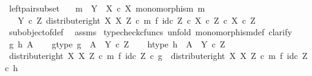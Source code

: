 \begin{isabellebody}
\isamarkupfalse%
%
\endisatagproof
{\isafoldproof}%
%
\isadelimproof
%
\endisadelimproof
%
\isadelimdocument
%
\endisadelimdocument
%
\isatagdocument
%
\isamarkuptrue%
%
\endisatagdocument
{\isafolddocument}%
%
\isadelimdocument
%
\endisadelimdocument
{}\isamarkupfalse%
\ left{\isacharunderscore}{\kern0pt}pair{\isacharunderscore}{\kern0pt}subset{\isacharcolon}{\kern0pt}\isanewline
\ \ \ {\isachardoublequoteopen}m\ {\isacharcolon}{\kern0pt}\ Y\ {\isasymrightarrow}\ X\ {\isasymtimes}\isactrlsub c\ X{\isachardoublequoteclose}\ {\isachardoublequoteopen}monomorphism\ m{\isachardoublequoteclose}\isanewline
\ \ \ {\isachardoublequoteopen}{\isacharparenleft}{\kern0pt}Y\ {\isasymtimes}\isactrlsub c\ Z{\isacharcomma}{\kern0pt}\ distribute{\isacharunderscore}{\kern0pt}right\ X\ X\ Z\ {\isasymcirc}\isactrlsub c\ {\isacharparenleft}{\kern0pt}m\ {\isasymtimes}\isactrlsub f\ id\isactrlsub c\ Z{\isacharparenright}{\kern0pt}{\isacharparenright}{\kern0pt}\ {\isasymsubseteq}\isactrlsub c\ {\isacharparenleft}{\kern0pt}X\ {\isasymtimes}\isactrlsub c\ Z{\isacharparenright}{\kern0pt}\ {\isasymtimes}\isactrlsub c\ {\isacharparenleft}{\kern0pt}X\ {\isasymtimes}\isactrlsub c\ Z{\isacharparenright}{\kern0pt}{\isachardoublequoteclose}\isanewline
%
\isadelimproof
\ \ %
\endisadelimproof
%
\isatagproof
{}\isamarkupfalse%
\ subobject{\isacharunderscore}{\kern0pt}of{\isacharunderscore}{\kern0pt}def{}\ \isamarkupfalse%
\ assms\isanewline
{}\isamarkupfalse%
\ {\isacharparenleft}{\kern0pt}typecheck{\isacharunderscore}{\kern0pt}cfuncs{\isacharcomma}{\kern0pt}\ unfold\ monomorphism{\isacharunderscore}{\kern0pt}def{}{\isacharcomma}{\kern0pt}\ clarify{\isacharparenright}{\kern0pt}\isanewline
\ \ \isamarkupfalse%
\ g\ h\ A\isanewline
\ \ \isamarkupfalse%
\ g{\isacharunderscore}{\kern0pt}type{\isacharcolon}{\kern0pt}\ {\isachardoublequoteopen}g\ {\isacharcolon}{\kern0pt}\ A\ {\isasymrightarrow}\ Y\ {\isasymtimes}\isactrlsub c\ Z{\isachardoublequoteclose}\isanewline
\ \ \isamarkupfalse%
\ h{\isacharunderscore}{\kern0pt}type{\isacharcolon}{\kern0pt}\ {\isachardoublequoteopen}h\ {\isacharcolon}{\kern0pt}\ A\ {\isasymrightarrow}\ Y\ {\isasymtimes}\isactrlsub c\ Z{\isachardoublequoteclose}\isanewline
\ \ \isamarkupfalse%
\ {\isachardoublequoteopen}{\isacharparenleft}{\kern0pt}distribute{\isacharunderscore}{\kern0pt}right\ X\ X\ Z\ {\isasymcirc}\isactrlsub c\ {\isacharparenleft}{\kern0pt}m\ {\isasymtimes}\isactrlsub f\ id\isactrlsub c\ Z{\isacharparenright}{\kern0pt}{\isacharparenright}{\kern0pt}\ {\isasymcirc}\isactrlsub c\ g\ {\isacharequal}{\kern0pt}\ {\isacharparenleft}{\kern0pt}distribute{\isacharunderscore}{\kern0pt}right\ X\ X\ Z\ {\isasymcirc}\isactrlsub c\ m\ {\isasymtimes}\isactrlsub f\ id\isactrlsub c\ Z{\isacharparenright}{\kern0pt}\ {\isasymcirc}\isactrlsub c\ h{\isachardoublequoteclose}\isanewline

\end{isabellebody}
